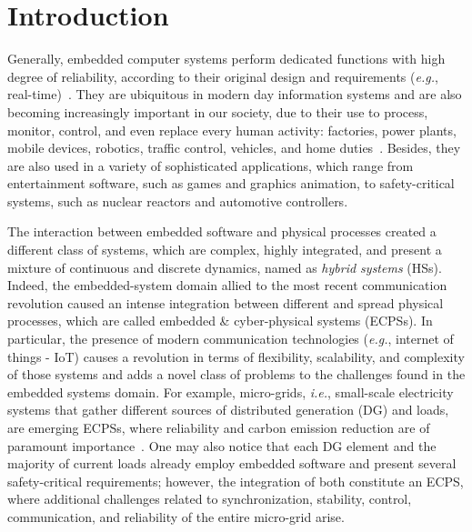 \documentclass[format=acmsmall, review=false, screen=true]{acmart}
\begin{document}


\maketitle

\section{Introduction}

Generally, embedded computer systems perform dedicated functions with high degree of reliability, according to their original design and requirements ({\it e.g.}, real-time)~\cite{Kopetz11}. They are ubiquitous in modern day information systems and are also becoming increasingly important in our society, due to their use to process, monitor, control, and even replace every human activity: factories, power plants, mobile devices, robotics, traffic control, vehicles, and home duties~\cite{xu15}. Besides, they are also used in a variety of sophisticated applications, which range from entertainment software, such as games and graphics animation, to safety-critical systems, such as nuclear reactors and automotive controllers. 

The interaction between embedded software and physical processes created a different class of systems, which are complex, highly integrated, and present a mixture of continuous and discrete dynamics, named as \textit{hybrid systems} (HSs). Indeed, the embedded-system domain allied to the most recent communication revolution caused an intense integration between different and spread physical processes, which are called embedded \& cyber-physical systems (ECPSs). In particular, the presence of modern communication technologies ({\it e.g.}, internet of things - IoT) causes a revolution in terms of flexibility, scalability, and complexity of those systems and adds a novel class of problems to the challenges found in the embedded systems domain. For example, micro-grids, {\it i.e.}, small-scale electricity systems that gather different sources of distributed generation (DG) and loads, are emerging ECPSs, where reliability and carbon emission reduction are of paramount importance~\cite{xu15}. One may also notice that each DG element and the majority of current loads already employ embedded software and present several safety-critical requirements; however, the integration of both constitute an ECPS, where additional challenges related to synchronization, stability, control, communication, and reliability of the entire micro-grid arise.
\end{document}
